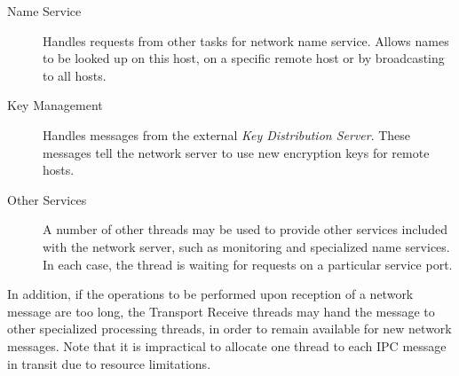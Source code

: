 \begin{description}
\item[Name Service] Handles requests from other tasks for network name
service.  Allows names to be looked up on this host, on a specific remote
host or by broadcasting to all hosts.

\item[Key Management] Handles messages from the external {\it Key
Distribution Server}.  These messages tell the network server to use new
encryption keys for remote hosts.

\item[Other Services] A number of other threads may be used to provide
other services included with the network server, such as monitoring
and specialized name services. In each case, the thread is waiting for
requests on a particular service port.
\end{description}

In addition, if the operations to be performed upon reception of a network
message are too long, the Transport Receive threads may hand the message to
other specialized processing threads, in order to remain available for new
network messages.  Note that it is impractical to allocate one thread to
each IPC message in transit due to resource limitations.

